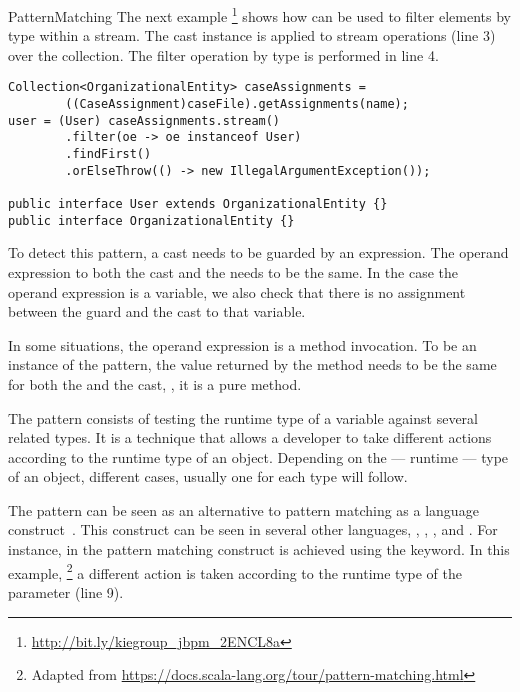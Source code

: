 \begin{pattern}{PatternMatching}
The next example%
\footnote{\url{http://bit.ly/kiegroup_jbpm_2ENCL8a}}
shows how \thisp{} can be used to filter elements by type within a stream.
The cast instance is applied to stream operations (line 3) over the  collection.
The filter operation by type is performed in line 4.

\begin{verbatim}
Collection<OrganizationalEntity> caseAssignments = 
		((CaseAssignment)caseFile).getAssignments(name);
user = (User) caseAssignments.stream()
		.filter(oe -> oe instanceof User)
		.findFirst()
		.orElseThrow(() -> new IllegalArgumentException());

public interface User extends OrganizationalEntity {}
public interface OrganizationalEntity {}
\end{verbatim}


\detection{}
To detect this pattern,
a cast needs to be guarded by an  expression.
The operand expression to both the cast and the  needs to be the same.
In the case the operand expression is a variable, we also check that there is no assignment between the  guard and the cast to that variable.

In some situations, the operand expression is a method invocation.
%
%
To be an instance of the \thisp{} pattern,
the value returned by the method needs to be the same for both the  and the cast, \ie, it is a pure method.

\discussion{}
The \thisp{} pattern consists of testing the runtime type of a variable against several related types.
It is a technique that allows a developer to take different actions according to the runtime type of an object.
Depending on the --- runtime --- type of an object, different cases, usually one for each type will follow.

The \thisp{} pattern can be seen as an \adhoc{} alternative to pattern matching as a language construct~\citep{lavilleLazyPatternMatching1987}.
This construct can be seen in several other languages, \eg, \scala{}, \csharp{}, and \haskell{}.
For instance, in \scala{} the pattern matching construct is achieved using the  keyword.
In this example,%
\footnote{Adapted from \url{https://docs.scala-lang.org/tour/pattern-matching.html}}
a different action is taken according to the runtime type of the parameter  (line 9).


\end{pattern}

